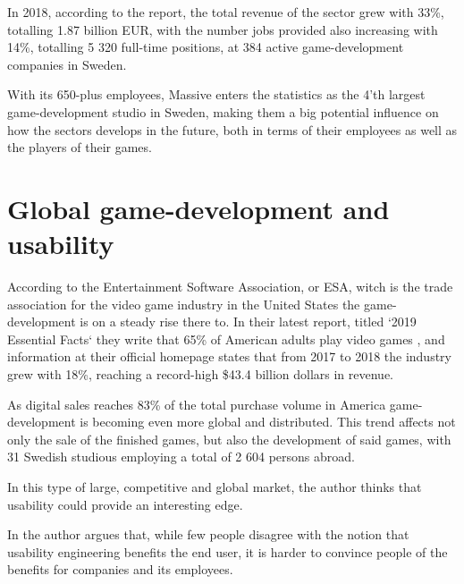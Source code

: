   In 2018, according to the report, the total revenue of the sector grew with
  33\%, totalling 1.87 billion EUR, with the number jobs provided also increasing
  with 14\%, totalling 5 320\cite[p. 12]{citeIndex2019} full-time positions,
  at 384\cite[p. 38]{citeIndex2019} active game-development companies in Sweden.

  With its 650-plus employees, Massive enters the statistics as the 4'th
  largest game-development studio in Sweden\cite[p. 21]{citeIndex2019},
  making them a big potential influence on how the sectors develops in the
  future, both in terms of their employees as well as the players of their
  games.


\section{Global game-development and usability}

  According to the Entertainment Software Association, or ESA, witch is the trade
  association for the video game industry in the United States the game-development
  is on a steady rise there to. In their latest report, titled `2019 Essential Facts`%
  \cite{cite2019EssentialFactsAbouttheComputerandVideoGameIndustryEntertainmentSoftwareAssociation}
  they write that 65\% of American adults play video
  games\cite[p. 4]{cite2019EssentialFactsAbouttheComputerandVideoGameIndustryEntertainmentSoftwareAssociation}
  , and information at their official homepage states that from 2017 to 2018
  the industry grew with 18\%, reaching a record-high \$43.4 billion dollars in
  revenue\cite{eseaEconomicGrowth}.

  As digital sales reaches 83\% of the total purchase volume in America%
  \cite[p. 20]{cite2019EssentialFactsAbouttheComputerandVideoGameIndustryEntertainmentSoftwareAssociation}
  game-development is becoming even more global and distributed. This trend affects
  not only the sale of the finished games, but also the development of said
  games, with 31 Swedish studious employing a total of 2 604 persons
  abroad\cite[p. 27]{citeIndex2019}.

  In this type of large, competitive and global market, the author thinks that
  usability could provide an interesting edge.

  In \cite{citeBottomLine} the author
  \citeauthor{citeBottomLine} argues that, while few people disagree with
  the notion that usability engineering benefits the end user, it is harder to
  convince people of the benefits for companies and its employees.

